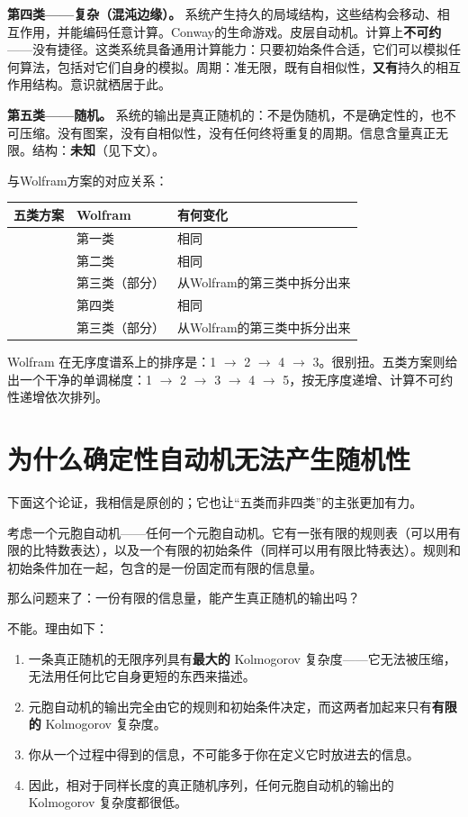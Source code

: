 \documentclass[11pt, twoside, openright]{book}
\begin{document}
\textbf{第四类------复杂（混沌边缘）。} 系统产生持久的局域结构，这些结构会移动、相互作用，并能编码任意计算。Conway的生命游戏。皮层自动机。计算上\textbf{不可约}------没有捷径。这类系统具备通用计算能力：只要初始条件合适，它们可以模拟任何算法，包括对它们自身的模拟。周期：准无限，既有自相似性，\textbf{又有}持久的相互作用结构。意识就栖居于此。

\textbf{第五类------随机。} 系统的输出是真正随机的：不是伪随机，不是确定性的，也不可压缩。没有图案，没有自相似性，没有任何终将重复的周期。信息含量真正无限。结构：\textbf{未知}（见下文）。

与Wolfram方案的对应关系：


{\small
\noindent
\begin{tabularx}{\linewidth}{>{\centering\arraybackslash}X >{\centering\arraybackslash}X X}
\toprule
\textbf{五类方案} & \textbf{Wolfram} & \textbf{有何变化} \\
\midrule
1 & 第一类 & 相同 \\[4pt]
2 & 第二类 & 相同 \\[4pt]
3 & 第三类（部分） & 从Wolfram的第三类中拆分出来 \\[4pt]
4 & 第四类 & 相同 \\[4pt]
5 & 第三类（部分） & 从Wolfram的第三类中拆分出来 \\[4pt]
\bottomrule
\end{tabularx}
}


Wolfram 在无序度谱系上的排序是：1 $\rightarrow$ 2 $\rightarrow$ 4 $\rightarrow$ 3。很别扭。五类方案则给出一个干净的单调梯度：1 $\rightarrow$ 2 $\rightarrow$ 3 $\rightarrow$ 4 $\rightarrow$ 5，按无序度递增、计算不可约性递增依次排列。

\section*{为什么确定性自动机无法产生随机性}

下面这个论证，我相信是原创的；它也让“五类而非四类”的主张更加有力。

考虑一个元胞自动机------任何一个元胞自动机。它有一张有限的规则表（可以用有限的比特数表达），以及一个有限的初始条件（同样可以用有限比特表达）。规则和初始条件加在一起，包含的是一份固定而有限的信息量。

那么问题来了：一份有限的信息量，能产生真正随机的输出吗？

不能。理由如下：

\begin{enumerate}
  \item 一条真正随机的无限序列具有\textbf{最大的} Kolmogorov 复杂度------它无法被压缩，无法用任何比它自身更短的东西来描述。
  \item 元胞自动机的输出完全由它的规则和初始条件决定，而这两者加起来只有\textbf{有限的} Kolmogorov 复杂度。
  \item 你从一个过程中得到的信息，不可能多于你在定义它时放进去的信息。
  \item 因此，相对于同样长度的真正随机序列，任何元胞自动机的输出的 Kolmogorov 复杂度都很低。
\end{enumerate}
\end{document}
